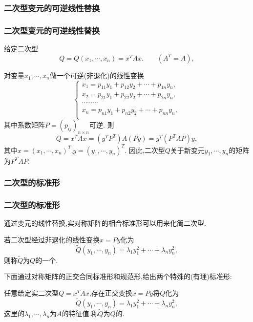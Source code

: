 \subsubsection{二次型变元的可逆线性替换}
\begin{frame}\frametitle{二次型变元的可逆线性替换}
给定二次型
\[Q=Q(x_1,\cdots,x_n) = x^TAx. \qquad(A^T=A),\]
\pp
\bigskip

对变量$x_1,\cdots,x_n$做一个可逆(非退化)的线性变换
\[\left\{\begin{array}{c}
x_1=p_{11}y_1 + p_{12}y_2 + \cdots + p_{1n}y_n,\\
x_2=p_{21}y_1 + p_{22}y_2 + \cdots + p_{2n}y_n,\\
\cdots\cdots\cdots\\
x_n=p_{n1}y_1 + p_{n2}y_2 + \cdots + p_{nn}y_n,\\
\end{array}\right.\]
其中系数矩阵$P=(p_{ij})_{n\times n}$可逆.
\pp
则
\[Q=x^TAx = (y^TP^T)A(Py) = y^T(P^TAP)y,\]
其中$x=(x_1,\cdots,x_n)^T$,$y=(y_1,\cdots,y_n)^T$.
\pp
因此,二次型$Q$关于新变元$y_1,\cdots,y_n$的矩阵为$P^TAP$.
\end{frame}



\subsubsection{二次型的标准形}
\begin{frame}\frametitle{二次型的标准形}
通过变元的线性替换,实对称矩阵的相合标准形可以用来化简二次型.
\pp
\begin{definition}[(有理)标准形]
若二次型经过非退化的线性变换$x=Py$化为
\[\widetilde{Q}(y_1,\cdots,y_n) = \lambda_1y_1^2+\cdots+\lambda_ny^2_n,\]
则称$\widetilde{Q}$为$Q$的一个.
\end{definition}
\pp
下面通过对称矩阵的正交合同标准形和规范形,给出两个特殊的(有理)标准形:
\pp
\begin{theorem}[正交标准形]
任意给定实二次型$Q=x^TAx$,存在正交变换$x=Py$将$Q$化为
\[\widetilde{Q}(y_1,\cdots,y_n) = \lambda_1y_1^2+\cdots+\lambda_ny_n^2,\]
这里的$\lambda_1,\cdots,\lambda_n$为$A$的特征值.称$\widetilde{Q}$为$Q$的.
\end{theorem}
\end{frame}





